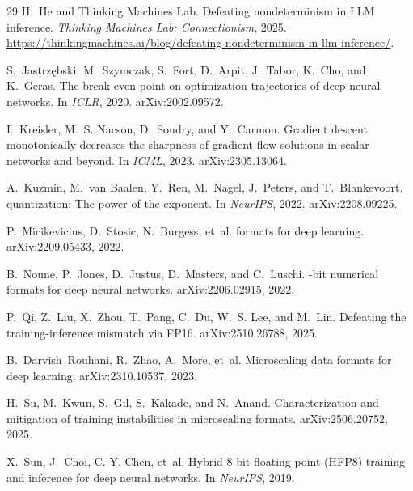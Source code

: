 \documentclass[11pt,letterpaper]{article}
\begin{document}
{\begin{thebibliography}{29}
H.~He and Thinking Machines Lab.
\newblock Defeating nondeterminism in {LLM} inference.
\newblock \emph{Thinking Machines Lab: Connectionism}, 2025. \url{https://thinkingmachines.ai/blog/defeating-nondeterminism-in-llm-inference/}.

S.~Jastrz{\k{e}}bski, M.~Szymczak, S.~Fort, D.~Arpit, J.~Tabor, K.~Cho, and K.~Geras.
\newblock The break-even point on optimization trajectories of deep neural networks.
\newblock In \emph{ICLR}, 2020. arXiv:2002.09572.

I.~Kreisler, M.~S. Nacson, D.~Soudry, and Y.~Carmon.
\newblock Gradient descent monotonically decreases the sharpness of gradient flow solutions in scalar networks and beyond.
\newblock In \emph{ICML}, 2023. arXiv:2305.13064.

A.~Kuzmin, M.~van Baalen, Y.~Ren, M.~Nagel, J.~Peters, and T.~Blankevoort.
 quantization: The power of the exponent.
\newblock In \emph{NeurIPS}, 2022. arXiv:2208.09225.

P.~Micikevicius, D.~Stosic, N.~Burgess, et~al.
 formats for deep learning.
\newblock arXiv:2209.05433, 2022.

B.~Noune, P.~Jones, D.~Justus, D.~Masters, and C.~Luschi.
-bit numerical formats for deep neural networks.
\newblock arXiv:2206.02915, 2022.

P.~Qi, Z.~Liu, X.~Zhou, T.~Pang, C.~Du, W.~S. Lee, and M.~Lin.
\newblock Defeating the training-inference mismatch via {FP16}.
\newblock arXiv:2510.26788, 2025.

B.~Darvish~Rouhani, R.~Zhao, A.~More, et~al.
\newblock Microscaling data formats for deep learning.
\newblock arXiv:2310.10537, 2023.

H.~Su, M.~Kwun, S.~Gil, S.~Kakade, and N.~Anand.
\newblock Characterization and mitigation of training instabilities in microscaling formats.
\newblock arXiv:2506.20752, 2025.

X.~Sun, J.~Choi, C.-Y. Chen, et~al.
\newblock Hybrid 8-bit floating point ({HFP8}) training and inference for deep neural networks.
\newblock In \emph{NeurIPS}, 2019.


\end{thebibliography}}
\end{document}
